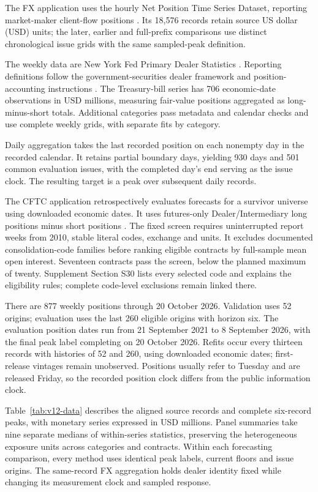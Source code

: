 \documentclass[11pt,a4paper]{article}
\begin{document}
The FX application uses the hourly Net Position Time Series Dataset, reporting market-maker client-flow positions \citep{dataset,wisniewski2020}. Its 18,576 records retain source US dollar (USD) units; the later, earlier and full-prefix comparisons use distinct chronological issue grids with the same sampled-peak definition.

The weekly data are New York Fed Primary Dealer Statistics \citep{nyfeddata}. Reporting definitions follow the government-securities dealer framework and position-accounting instructions \citep{fr2004_2013,fr2004_2024}. The Treasury-bill series has 706 economic-date observations in USD millions, measuring fair-value positions aggregated as long-minus-short totals. Additional categories pass metadata and calendar checks and use complete weekly grids, with separate fits by category.

Daily aggregation takes the last recorded position on each nonempty day in the recorded calendar. It retains partial boundary days, yielding 930 days and 501 common evaluation issues, with the completed day's end serving as the issue clock. The resulting target is a peak over subsequent daily records.

The CFTC application retrospectively evaluates forecasts for a survivor universe using downloaded economic dates. It uses futures-only Dealer/Intermediary long positions minus short positions \citep{cftcTFF}. The fixed screen requires uninterrupted report weeks from 2010, stable literal codes, exchange and units. It excludes documented consolidation-code families before ranking eligible contracts by full-sample mean open interest. Seventeen contracts pass the screen, below the planned maximum of twenty. Supplement Section S30 lists every selected code and explains the eligibility rules; complete code-level exclusions remain linked there.

There are 877 weekly positions through 20 October 2026. Validation uses 52 origins; evaluation uses the last 260 eligible origins with horizon six. The evaluation position dates run from 21 September 2021 to 8 September 2026, with the final peak label completing on 20 October 2026. Refits occur every thirteen records with histories of 52 and 260, using downloaded economic dates; first-release vintages remain unobserved. Positions usually refer to Tuesday and are released Friday, so the recorded position clock differs from the public information clock.

Table~\ref{tab:v12-data} describes the aligned source records and complete six-record peaks, with monetary series expressed in USD millions. Panel summaries take nine separate medians of within-series statistics, preserving the heterogeneous exposure units across categories and contracts. Within each forecasting comparison, every method uses identical peak labels, current floors and issue origins. The same-record FX aggregation holds dealer identity fixed while changing its measurement clock and sampled response.
\end{document}

